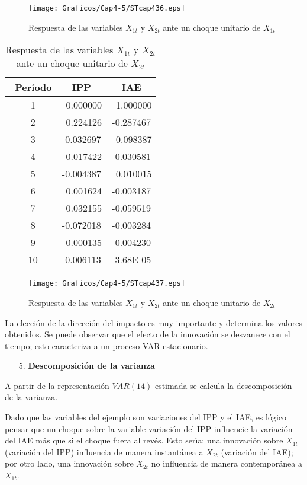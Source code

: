 \begin{enumerate}
\begin{figure}[H]
\centering
\texttt{[image: Graficos/Cap4-5/STcap436.eps]}
\caption{Respuesta de las variables $X_{1t}$ y $X_{2t}$ ante un choque unitario de $X_{1t}$}
\label{fig36}
\end{figure}

\begin{table}[H]
\centering
\begin{tabular}{ccc}\hline
~Per\'{i}odo & IPP & IAE \\ \hline \hline
~1 & ~0.000000 & ~1.000000 \\
~2 & ~0.224126 & -0.287467 \\
~3 & -0.032697 & ~0.098387 \\
~4 & ~0.017422 & -0.030581 \\
~5 & -0.004387 & ~0.010015 \\
~6 & ~0.001624 & -0.003187 \\
~7 & ~0.032155 & -0.059519 \\
~8 & -0.072018 & -0.003284 \\
~9 & ~0.000135 & -0.004230 \\
~10& -0.006113& -3.68E-05 \\ \hline\hline
\end{tabular}
\caption{Respuesta de las variables $X_{1t}$ y $X_{2t}$ ante un choque unitario de $X_{2t}$}
\label{tab42}
\end{table}

\begin{figure}[H]
\centering
\texttt{[image: Graficos/Cap4-5/STcap437.eps]}
\caption{Respuesta de las variables $X_{1t}$ y $X_{2t}$ ante un choque unitario de $X_{2t}$}
\label{fig37}
\end{figure}

La elecci\'{o}n de la direcci\'{o}n del impacto es muy importante y determina los valores obtenidos. Se puede observar que el efecto de la innovaci\'{o}n se desvanece con el tiempo; esto caracteriza a un proceso VAR estacionario.

\begin{enumerate}
\item[5.] \textbf{Descomposici\'{o}n de la varianza}
\end{enumerate}

A partir de la representaci\'{o}n $VAR(14)$ estimada se calcula la descomposici\'{o}n de la varianza.\newline

Dado que las variables del ejemplo son variaciones del IPP y el IAE, es l\'{o}gico pensar que un choque sobre la variable variaci\'{o}n del IPP influencie la variaci\'{o}n del IAE m\'{a}s que si el choque fuera al rev\'{e}s. Esto ser\'{\i}a: una innovaci\'{o}n sobre $X_{1t}$ (variaci\'{o}n del IPP) influencia de manera instant\'{a}nea a $X_{2t}$ (variaci\'{o}n del IAE); por otro lado, una innovaci\'{o}n sobre $X_{2t}$ no influencia de manera contempor\'{a}nea a $X_{1t}$.\newline


\end{enumerate}
